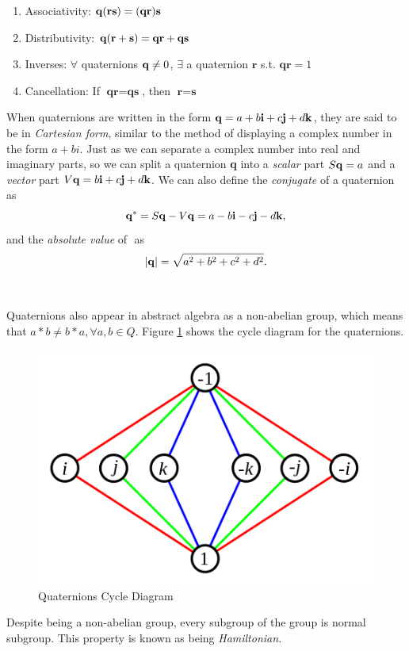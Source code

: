 \begin{thm}
\label{thm:mult}
\begin{enumerate} \textit{Properties of Quaternion Multiplication}
	\item Associativity: $\text{\textbf{q}} ( \textbf{r} \textbf{s}) = (\textbf{q} \textbf{r}) \textbf{s}$
	\item Distributivity: $\text{\textbf{q}} (\textbf{r} + \textbf{s}) = \textbf{q} \textbf{r} + \textbf{q} \textbf{s}$
	\item Inverses: $\forall$ quaternions $\text{\textbf{q}} \neq 0$, $\exists$ a quaternion $\textbf{r}$ s.t. $\textbf{qr} = 1$
	\item Cancellation: If $\textbf{qr}=\textbf{qs}$, then $\textbf{r} = \textbf{s}$
\end{enumerate}

\end{thm}

\noindent When quaternions are written in the form $\text{\textbf{q}} = a + b\text{\textbf{i}} + c\text{\textbf{j}} + d\text{\textbf{k}}$, they are said to be in \textit{Cartesian form}, similar to the method of displaying a complex number in the form $a + bi$.
Just as we can separate a complex number into real and imaginary parts, so we can split a quaternion \textbf{q} into a \textit{scalar} part $S\text{\textbf{q}} = a$ and a \textit{vector} part $V\text{\textbf{q}} = b\text{\textbf{i}} + c\text{\textbf{j}} + d\text{\textbf{k}}$.
We can also define the \textit{conjugate} of a quaternion as $$ \text{\textbf{q}}^* = S\text{\textbf{q}} - V\text{\textbf{q}} = a - b\text{\textbf{i}} - c\text{\textbf{j}} - d\text{\textbf{k}},$$ and the \textit{absolute value} of \qq$ $ as $$ \lvert\text{\textbf{q}}\rvert = \sqrt{a^2 + b^2 + c^2 + d^2}.$$
\\ \\
\noindent Quaternions also appear in abstract algebra as a non-abelian group, which means that $a * b \neq b * a, \forall a,b \in Q$.
Figure \ref{fig:cycle} shows the cycle diagram for the quaternions.

\begin{figure}[H]
\centering
\includegraphics[width = .65\textwidth]{Figures/cycle.png}
\caption{Quaternions Cycle Diagram}
\label{fig:cycle}
\end{figure}
Despite being a non-abelian group, every subgroup of the group is normal subgroup.
This property is known as being \textit{Hamiltonian}.

